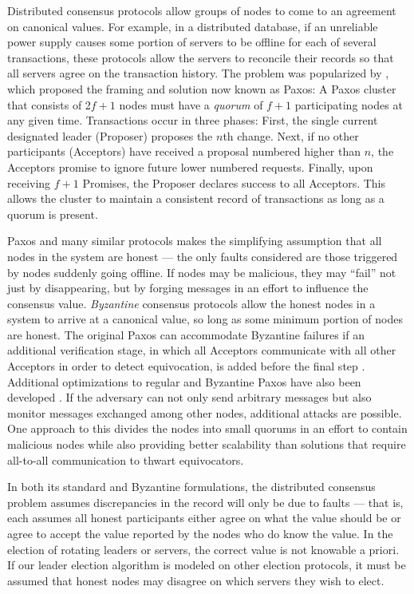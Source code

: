     Distributed consensus protocols allow groups of nodes to come to an
    agreement on canonical values. For example, in a distributed database, if an
    unreliable power supply causes some portion of servers to be offline for
    each of several transactions, these protocols allow the
    servers to reconcile their records so that all servers agree on the
    transaction history. The problem was popularized by
    \cite{paxos}, which proposed the framing and solution now
    known as Paxos: A Paxos cluster that consists of 2$f+1$ nodes must have a
    \emph{quorum} of $f + 1$ participating nodes at any given time.
    Transactions occur in three phases: First, the single current designated
    leader (Proposer) proposes the $n$th change. Next, if no other participants
    (Acceptors) have received a proposal numbered higher than $n$, the Acceptors
    promise to ignore future lower numbered requests.  Finally, upon receiving
    $f+1$ Promises, the Proposer declares success to all Acceptors. This allows
    the cluster to maintain a consistent record of transactions as long as a
    quorum is present.

    Paxos and many similar protocols makes the simplifying assumption that all
    nodes in the system are honest --- the only faults considered are those
    triggered by nodes suddenly going offline. If nodes may be malicious, they
    may ``fail'' not just by disappearing, but by forging messages in an effort
    to influence the consensus value. \emph{Byzantine} consensus protocols allow
    the honest nodes in a system to arrive at a canonical value, so long as some
    minimum portion of nodes are honest. The original Paxos can
    accommodate Byzantine failures if an additional verification stage, in which
    all Acceptors communicate with all other Acceptors in order to detect
    equivocation, is added before the final step \cite{castro_practical_1999}.
    Additional optimizations to regular and Byzantine Paxos have also been
    developed \cite{lamport_fast_2006}. If the adversary can not only send
    arbitrary messages but also monitor messages exchanged among other nodes,
    additional attacks are possible. One approach to this divides the nodes into
    small quorums in an effort to contain malicious nodes \cite{king_load_2011}
    while also providing better scalability than solutions that require
    all-to-all communication to thwart equivocators.

    In both its standard and Byzantine formulations, the distributed consensus
    problem assumes discrepancies in the record will only be due to faults ---
    that is, each assumes all honest participants either agree on what the value
    should be or agree to accept the value reported by the nodes who do know the
    value.  In the election of rotating leaders or servers, the correct value is
    not knowable a priori. If our leader election algorithm is modeled on other
    election protocols, it must be assumed that honest nodes may disagree on
    which servers they wish to elect.

